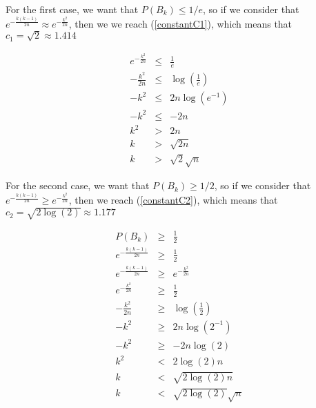 \documentclass[tikz, 12pt]{scrartcl}
\begin{document}
\begin{enumerate}
	For the first case, we want that $P(B_{k}) \leq 1/e$, so if we consider that  $e^{-\frac{k(k-1)}{2n}} \approx e^{-\frac{k^2}{2n}} $, then we we reach (\ref{constantC1}), which means that $c_1 = \sqrt{2} \approx 1.414$
	
	\begin{eqnarray}
	{\displaystyle e^{-\frac{k^2}{2n}} }		&	\leq	&	\frac{1}{e} \nonumber \\
	-\frac{k^2}{2n}						&	\leq &	\log\left(\frac{1}{e}\right) \nonumber \\
	-k^2								& 	\leq & 2n \log(e^{-1}) \nonumber \\
	-k^2								&	\leq	& -2n  \nonumber \\
	k^2								& 	>	& 2  n \nonumber \\
	k								&	>	&	\sqrt{ 2 n} \nonumber \\
	k								&	>	&	\sqrt{ 2}\sqrt{n} \label{constantC1}
	\end{eqnarray}

	
	For the second case, we want that $P(B_{k}) \geq 1/2$, so if we consider that $e^{-\frac{k(k-1)}{2n}} \geq e^{-\frac{k^2}{2n}} $, then we reach (\ref{constantC2}), which means that $c_2 = \sqrt{ 2 \log(2)} \approx 1.177$
	
		
	\begin{eqnarray}
	P(B_k) 							&	\geq &	\frac{1}{2} \nonumber \\
	{\displaystyle e^{-\frac{k(k-1)}{2n}} }		&	\geq	&	\frac{1}{2} \nonumber \\
	{\displaystyle e^{-\frac{k(k-1)}{2n}} }		&	\geq	&	{\displaystyle e^{-\frac{k^2}{2n}} }	 \nonumber \\
	{\displaystyle e^{-\frac{k^2}{2n}} }		&	\geq	&	\frac{1}{2} \nonumber \\
	-\frac{k^2}{2n}						&	\geq &	\log\left(\frac{1}{2}\right) \nonumber \\
	-k^2								& 	\geq & 2n \log(2^{-1}) \nonumber \\
	-k^2								&	\geq	& -2n \log(2) \nonumber \\
	k^2								& <		& 2 \log(2) n \nonumber \\
	k								&	<	&	\sqrt{ 2 \log(2) n} \nonumber \\
	k								&	<	&	\sqrt{ 2 \log(2)}\sqrt{n} \label{constantC2}
	\end{eqnarray}


\end{enumerate}
\end{document}
